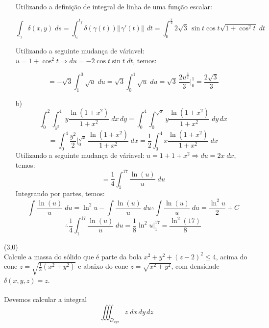 \documentclass[12pt,a4paper]{article}
\begin{document}
\begin{itemize}
Utilizando a definição de integral de linha de uma função escalar:

$$  \int_{\gamma}{\delta(x,y)}\;ds = \int_{t_i}^{t_f} {\delta(\gamma(t)) ||\gamma'(t) ||}\;dt = \int_{0}^{\frac{\pi}{2}} 2 \sqrt{3} \, \sin t \cos t \sqrt{1 + \cos^2 t} \;dt $$

Utilizando a seguinte mudança de váriavel: $u = 1 + \cos^2 t \Rightarrow du = -2\cos t \sin t \; dt $, temos:

$$ = -\sqrt{3} \int_1^0 \sqrt{u} \; du =  \sqrt{3} \int_0^1 \sqrt{u} \; du = \sqrt{3} \, \frac{2u^{\frac{3}{2}}}{3} \Big|_0^1 = \frac{2\sqrt{3}}{3} $$

\item[b)] $$ \int_0^2 \int_{y^2}^4 y \frac{\ln (1+x^2)}{1+x^2} \; dx \, dy = \int_0^4 \int_0^{\sqrt{x}} y \frac{\ln (1+x^2)}{1+x^2} \; dy \, dx  $$
$$ = \int_0^4  \frac{y^2}{2} \Big|_0^{\sqrt{x}} \, \frac{\ln (1+x^2)}{1+x^2} \; dx = \frac{1}{2} \int_0^4 x \frac{\ln (1+x^2)}{1+x^2} \; dx $$
Utilizando a seguinte mudança de váriavel: $u = 1 + 1+x^2 \Rightarrow du = 2 x \; dx $, temos:
$$ =  \frac{1}{4} \int_1^{17} \frac{\ln (u)}{u} \; du $$
Integrando por partes, temos:
$$ \int \frac{\ln (u)}{u} \; du = \ln^2 u - \int \frac{\ln (u)}{u} \; du \therefore \int \frac{\ln (u)}{u} \; du = \frac{\ln^2 u}{2} + C $$
$$ \therefore \frac{1}{4} \int_1^{17} \frac{\ln (u)}{u} \; du = \frac{1}{8} \ln^2 u \Big|_1^{17} = \frac{\ln^2(17)}{8} $$

\end{itemize}

\newpage

 (3,0) \\

Calcule a massa do sólido que é parte da bola $ x^2 + y^2 + (z-2)^2 \leq 4 $, acima do cone $ z = \displaystyle\sqrt{\frac{1}{3}(x^2 + y^2)}$ e abaixo do cone $z = \sqrt{x^2 + y^2}$, com densidade $\delta(x,y,z) = z$. \\

\\

Devemos calcular a integral
\begin{equation}
 \iiint_{D_{xyz}} z \;dx\,dy\,dz \
\label{eq:integral}
\end{equation}
\end{document}
